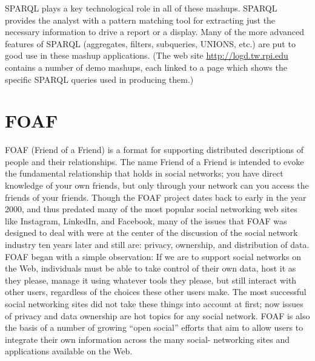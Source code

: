 SPARQL plays a key technological role in all of these mashups. SPARQL
provides the analyst with a pattern matching tool for extracting just
the necessary information to drive a report or a display. Many of the
more advanced features of SPARQL (aggregates, filters, subqueries,
UNIONS, etc.) are put to good use in these mashup applications. (The web
site \url{http://logd.tw.rpi.edu} contains a number of demo mashups,
each linked to a page which shows the specific SPARQL queries used in
producing them.)

\section{FOAF}
\label{foaf}
FOAF (Friend of a Friend) is a format for supporting distributed
descriptions of people and their relationships. The name Friend of a
Friend is intended to evoke the fundamental relationship that holds in
social networks; you have direct knowledge of your own friends, but only
through your network can you access the friends of your friends. Though
the FOAF project dates back to early in the year 2000, and thus predated
many of the most popular social networking web sites like Instagram,
LinkedIn, and Facebook, many of the issues that FOAF was designed to
deal with were at the center of the discussion of the social network
industry ten years later and still are: privacy, ownership, and
distribution of data. FOAF began with a simple observation: If we are to
support social networks on the Web, individuals must be able to take
control of their own data, host it as they please, manage it using
whatever tools they please, but still interact with other users,
regardless of the choices these other users make. The most successful
social networking sites did not take these things into account at first;
now issues of privacy and data ownership are hot topics for any social
network. FOAF is also the basis of a number of growing ``open social''
efforts that aim to allow users to integrate their own information
across the many social- networking sites and applications available on
the Web.


